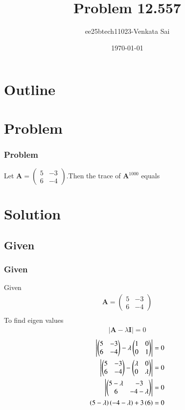 \documentclass{beamer}
\title{Problem 12.557}
\author{ee25btech11023-Venkata Sai}
\date{\today}
\providecommand{\brak}[1]{\ensuremath{\left(#1\right)}}
\theoremstyle{remark}
\newcommand{\myvec}[1]{\ensuremath{\begin{pmatrix}#1\end{pmatrix}}}
\let\vec\mathbf
\numberwithin{equation}{section}
\begin{document}
\begin{frame}
\titlepage
\end{frame}

\section*{Outline}
\begin{frame}
\tableofcontents
\end{frame}

\section{Problem}

\begin{frame}
\frametitle{Problem}
Let $\vec{A}=\myvec{5&-3\\6&-4}$.Then the trace of $\vec{A}^{1000}$ equals\\
\end{frame}
\section{Solution}


\subsection{Given}
\begin{frame}
\frametitle{Given}
  Given
  \begin{align}
      \vec{A}=\myvec{5&-3\\6&-4} \\
  \end{align}
  To find eigen values
  \begin{align}
      |\vec{A}-\lambda\vec{I}|=0
      \end{align}
      \begin{align}
            \mydet{\myvec{5&-3\\6&-4}-\lambda\myvec{1&0\\0&1}}=0\\
            \mydet{\myvec{5&-3\\6&-4}-\myvec{\lambda&0\\0&\lambda}}=0\\
            \mydet{\myvec{5-\lambda&-3\\6&-4-\lambda}}=0 \\
            \brak{5-\lambda}\brak{-4-\lambda}+3\brak{6}=0
  \end{align}
\end{frame}
\end{document}
